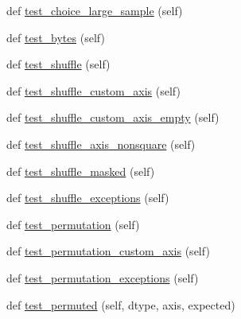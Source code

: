 \begin{DoxyCompactItemize}
\item 
def \hyperlink{classnumpy_1_1random_1_1tests_1_1test__generator__mt19937_1_1TestRandomDist_a729bc67237523738d1be998690c886c2}{test\+\_\+choice\+\_\+large\+\_\+sample} (self)
\item 
def \hyperlink{classnumpy_1_1random_1_1tests_1_1test__generator__mt19937_1_1TestRandomDist_aff97f87cccf8b2786a693e38cf86aece}{test\+\_\+bytes} (self)
\item 
def \hyperlink{classnumpy_1_1random_1_1tests_1_1test__generator__mt19937_1_1TestRandomDist_a5891bc71591bbcf172093413a3f93339}{test\+\_\+shuffle} (self)
\item 
def \hyperlink{classnumpy_1_1random_1_1tests_1_1test__generator__mt19937_1_1TestRandomDist_a8d8cb8b9ac942a12bc176b7eeb718a81}{test\+\_\+shuffle\+\_\+custom\+\_\+axis} (self)
\item 
def \hyperlink{classnumpy_1_1random_1_1tests_1_1test__generator__mt19937_1_1TestRandomDist_a4ef3ac5226d722993bc67efb912f3343}{test\+\_\+shuffle\+\_\+custom\+\_\+axis\+\_\+empty} (self)
\item 
def \hyperlink{classnumpy_1_1random_1_1tests_1_1test__generator__mt19937_1_1TestRandomDist_adcdca42b7742c4755946a48ab9a4d220}{test\+\_\+shuffle\+\_\+axis\+\_\+nonsquare} (self)
\item 
def \hyperlink{classnumpy_1_1random_1_1tests_1_1test__generator__mt19937_1_1TestRandomDist_a3e32d8add9565fef1be7737d1ccb689b}{test\+\_\+shuffle\+\_\+masked} (self)
\item 
def \hyperlink{classnumpy_1_1random_1_1tests_1_1test__generator__mt19937_1_1TestRandomDist_ad5d089a2060a8894cc7dee06b2f19574}{test\+\_\+shuffle\+\_\+exceptions} (self)
\item 
def \hyperlink{classnumpy_1_1random_1_1tests_1_1test__generator__mt19937_1_1TestRandomDist_ab478bc3005b7d4b37fd1f617e8561d65}{test\+\_\+permutation} (self)
\item 
def \hyperlink{classnumpy_1_1random_1_1tests_1_1test__generator__mt19937_1_1TestRandomDist_a8afc6e25375cca884b583117ef3a1320}{test\+\_\+permutation\+\_\+custom\+\_\+axis} (self)
\item 
def \hyperlink{classnumpy_1_1random_1_1tests_1_1test__generator__mt19937_1_1TestRandomDist_af1eebd6ef98a82896cf3d57c681aa816}{test\+\_\+permutation\+\_\+exceptions} (self)
\item 
def \hyperlink{classnumpy_1_1random_1_1tests_1_1test__generator__mt19937_1_1TestRandomDist_a2726c10dd9de05d30aecf262c7ac5697}{test\+\_\+permuted} (self, dtype, axis, expected)
\item 

\end{DoxyCompactItemize}
